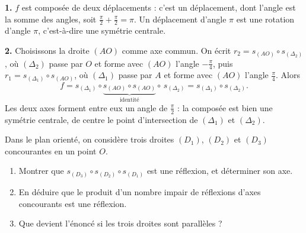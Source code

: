 \begin{corrige}
\textbf{1.} $f$ est composée de deux déplacements : c'est un déplacement, dont
l'angle est la somme des angles, soit $\frac{\pi}{2}+\frac{\pi}{2} = \pi$.
Un déplacement d'angle $\pi$ est une rotation d'angle $\pi$, c'est-à-dire une
symétrie centrale.

\textbf{2.} Choisissons la droite $(AO)$ comme axe commun. On écrit
$r_{2} = s_{(AO)} \circ s_{(\Delta_{2})}$, où $(\Delta_{2})$ passe par $O$ et
forme avec $(AO)$ l'angle $-\frac{\pi}{4}$, puis
$r_{1} = s_{(\Delta_{1})} \circ s_{(AO)}$, où $(\Delta_{1})$ passe par $A$ et
forme avec $(AO)$ l'angle $\frac{\pi}{4}$. Alors
\[
  f = s_{(\Delta_{1})} \circ \underbrace{s_{(AO)} \circ s_{(AO)}}_{
  \text{identité}} \circ\, s_{(\Delta_{2})}
  = s_{(\Delta_{1})} \circ s_{(\Delta_{2})} .
\]
Les deux axes forment entre eux un angle de $\frac{\pi}{2}$ : la composée est
bien une symétrie centrale, de centre le point d'intersection de
$(\Delta_{1})$ et $(\Delta_{2})$.
\end{corrige}

\begin{concours}
Dans le plan orienté, on considère trois droites $(D_{1})$, $(D_{2})$ et
$(D_{3})$ concourantes en un point $O$.

\begin{enumerate}[label=\textbf{\arabic*.}, leftmargin=*, itemsep=0.25em]
  \item Montrer que
        $s_{(D_{3})} \circ s_{(D_{2})} \circ s_{(D_{1})}$ est une réflexion,
        et déterminer son axe.
  \item En déduire que le produit d'un nombre impair de réflexions d'axes
        concourants est une réflexion.
  \item Que devient l'énoncé si les trois droites sont parallèles ?
\end{enumerate}
\end{concours}

